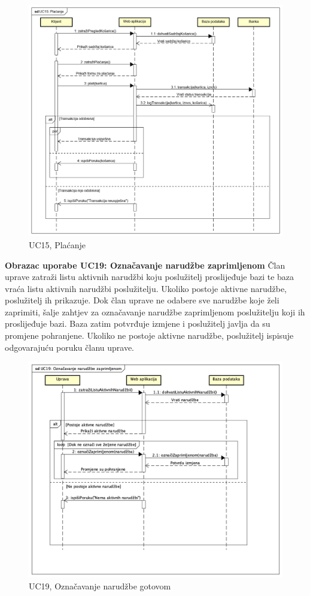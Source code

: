 				\begin{figure}[H]
					\includegraphics[width=\linewidth]{dijagrami/UC15.png}
					\centering
					\caption{UC15, Plaćanje}
					\label{fig:SequanceDiagram2}
				\end{figure}
			\pagebreak
			\textbf{Obrazac uporabe UC19: Označavanje narudžbe zaprimljenom}
			\bigbreak
			\textnormal {Član uprave zatraži listu aktivnih narudžbi koju poslužitelj proslijeđuje bazi te baza vraća listu aktivnih narudžbi poslužitelju. Ukoliko postoje aktivne narudžbe, poslužitelj ih prikazuje. Dok član uprave ne odabere sve narudžbe koje želi zaprimiti, šalje zahtjev za označavanje narudžbe zaprimljenom poslužitelju koji ih proslijeđuje bazi. Baza zatim potvrđuje izmjene i poslužitelj javlja da su promjene pohranjene. Ukoliko ne postoje aktivne narudžbe, poslužitelj ispisuje odgovarajuću poruku članu uprave.
			}
				\begin{figure}[H]
					\includegraphics[width=\linewidth]{dijagrami/UC19.png}
					\centering
					\caption{UC19, Označavanje narudžbe gotovom}
					\label{fig:SequanceDiagram3}
				\end{figure}
